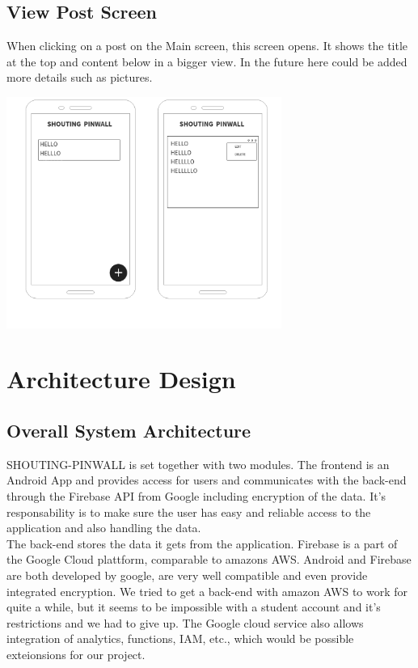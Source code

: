 \documentclass[conference]{IEEEtran}
\numberwithin{figure}{subsection}
\begin{document}
\subsection{View Post Screen}
When clicking on a post on the Main screen, this screen opens. It shows the title at the top and content below in a bigger view. In the future here could be added more details such as pictures.\\

\begin{center}
\includegraphics[width=9cm]{bibtex/images/Post_Viewing_Screen.png}
\end{center}


\section{Architecture Design}
\subsection{Overall System Architecture}
SHOUTING-PINWALL is set together with two modules. The frontend is an Android App and provides access for users and communicates with the back-end through the Firebase API from Google including encryption of the data. It's responsability is to make sure the user has easy and reliable access to the application and also handling the data.\\

The back-end stores the data it gets from the application. Firebase is a part of the Google Cloud plattform, comparable to amazons AWS. Android and Firebase are both developed by google, are very well compatible and even provide integrated encryption. We tried to get a back-end with amazon AWS to work for quite a while, but it seems to be impossible with a student account and it's restrictions and we had to give up. The Google cloud service also allows integration of analytics, functions, IAM, etc., which would be possible exteionsions for our project.\\
\end{document}
